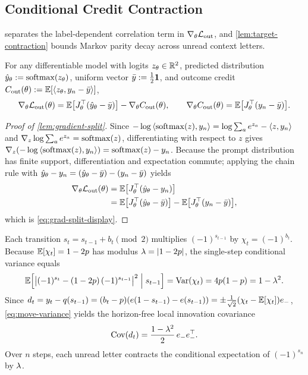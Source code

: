 \subsection{Conditional Credit Contraction}
\label{app:assumptions}
\label{app:target-spectrum}
\label{app:contraction}
\label{rem:two-block-bias}

 separates the label-dependent correlation term in $\nabla_\theta\mathcal L_{\mathrm{out}}$, and \cref{lem:target-contraction} bounds Markov parity decay across unread context letters.

\begin{lemma}
\label{lem:gradient-split}
For any differentiable model with logits $z_\theta \in \mathbb R^2$, predicted distribution $\hat y_\theta := \operatorname{softmax}(z_\theta)$, uniform vector $\bar y := \frac{1}{2}\mathbf 1$, and outcome credit $C_{\mathrm{out}}(\theta) := \mathbb E[\langle z_\theta, y_n - \bar y\rangle]$,
\begin{equation}
 \nabla_\theta\mathcal L_{\mathrm{out}}(\theta) = \mathbb E\bigl[J_\theta^\top(\hat y_\theta - \bar y)\bigr] - \nabla_\theta C_{\mathrm{out}}(\theta), \qquad
 \nabla_\theta C_{\mathrm{out}}(\theta) = \mathbb E\bigl[J_\theta^\top(y_n - \bar y)\bigr].
 \label{eq:grad-split-display}
\end{equation}
\end{lemma}
\begin{proof}[Proof of \cref{lem:gradient-split}]
Since $-\log\left\langle \operatorname{softmax}(z),y_n\right\rangle = \log\sum_a e^{z_a} - \left\langle z,y_n\right\rangle$ and $\nabla_z\log\sum_a e^{z_a} = \operatorname{softmax}(z)$, differentiating with respect to $z$ gives $\nabla_z(-\log\left\langle \operatorname{softmax}(z),y_n\right\rangle) = \operatorname{softmax}(z) - y_n$. Because the prompt distribution has finite support, differentiation and expectation commute; applying the chain rule with $\hat y_\theta - y_n = (\hat y_\theta - \bar y) - (y_n - \bar y)$ yields
\begin{align*}
  \nabla_\theta\mathcal L_{\mathrm{out}}(\theta)
  &= \mathbb E\bigl[J_\theta^\top(\hat y_\theta - y_n)\bigr] \\
  &= \mathbb E\bigl[J_\theta^\top(\hat y_\theta - \bar y)\bigr] - \mathbb E\bigl[J_\theta^\top(y_n - \bar y)\bigr],
\end{align*}
which is \cref{eq:grad-split-display}.
\end{proof}

Each transition $s_t = s_{t-1} + b_t \pmod 2$ multiplies $(-1)^{s_{t-1}}$ by $\chi_t = (-1)^{b_t}$. Because $\mathbb E[\chi_t] = 1 - 2p$ has modulus $\lambda = |1-2p|$, the single-step conditional variance equals
\begin{equation}
 \mathbb E\Bigl[\bigl|(-1)^{s_t} - (1 - 2p)\,(-1)^{s_{t-1}}\bigr|^2 \Bigm| s_{t-1}\Bigr] = \operatorname{Var}(\chi_t) = 4p(1-p) = 1 - \lambda^2.
 \label{eq:move-variance}
\end{equation}
Since $d_t = y_t - q(s_{t-1}) = (b_t - p)(e(1-s_{t-1}) - e(s_{t-1})) = \pm\frac{1}{\sqrt 2}(\chi_t - \mathbb E[\chi_t])e_-$, \cref{eq:move-variance} yields the horizon-free local innovation covariance
\begin{equation}
  \operatorname{Cov}(d_t) = \frac{1 - \lambda^2}{2}\,e_- e_-^\top.
  \label{eq:local-variation}
\end{equation}
Over $n$ steps, each unread letter contracts the conditional expectation of $(-1)^{s_n}$ by $\lambda$.

